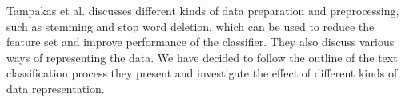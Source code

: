 Tampakas et al. discusses different kinds of data preparation and preprocessing, such as stemming and stop word deletion, which can be used to reduce the feature set and improve performance of the classifier. They also discuss various ways of representing the data. We have decided to follow the outline of the text classification process they present and investigate the effect of different kinds of data representation. \cite{Ikonomakis05TextClassification}